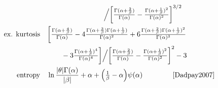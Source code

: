 \begin{table*}[pt!]
\begin{align*}
 \hspace{-3em}
 \\ & \qquad \qquad \qquad \qquad \Big /
 \Left[  \tfrac{\Gamma(\alpha+\frac{2}{\beta})}{\Gamma(\alpha)}  - 
\tfrac{\Gamma(\alpha+\frac{1}{\beta})^2}{\Gamma(\alpha)^2}    \Right]^{3/2}
\hspace{-3em}
\checked
\\
\text{ex. kurtosis} \quad  &  
 \bigg[  \tfrac{\Gamma(\alpha+\frac{4}{\beta})}{\Gamma(\alpha)} 
 - 4 \tfrac{\Gamma(\alpha+\frac{3}{\beta})\Gamma(\alpha+\frac{1}{\beta})}{\Gamma(\alpha)^2}    
 + 6 \tfrac{\Gamma(\alpha+\frac{2}{\beta})\Gamma(\alpha+\frac{1}{\beta})^2}{\Gamma(\alpha)^3}    
\hspace{-3em}
\checked
 \\ & \qquad 
 -3  \tfrac{\Gamma(\alpha+\frac{1}{\beta})^4}{\Gamma(\alpha)^4}   \bigg]
 \Big /
 \Left[  \tfrac{\Gamma(\alpha+\frac{2}{\beta})}{\Gamma(\alpha)}  - 
\tfrac{\Gamma(\alpha+\frac{1}{\beta})^2}{\Gamma(\alpha)^2}    \Right]^{2}
-3 
\hspace{-3em}
\\
\text{entropy} \quad& 
\ln \frac{|\theta| \Gamma(\alpha)}{|\beta|} +\alpha + \Left( \sfrac{1}{\beta} - \alpha\Right) \psi(\alpha) \checked &
\text{\cite{Dadpay2007}}
\end{align*}
\end{table*}

